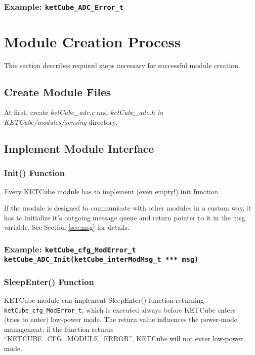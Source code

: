 \documentclass[twoside,a4paper]{refart}
\begin{document}
\subsubsection*{Example: {\tt ketCube\_ADC\_Error\_t}}

\clearpage
\section{Module Creation Process}
This section describes required steps necessary for successful module creation.

\subsection*{Create Module Files}
At first, create {\it ketCube\_adc.c} and {\it ketCube\_adc.h in} \\{\it KETCube/modules/sensing} directory.


\subsection*{Implement Module Interface}
\subsubsection*{Init() Function}
Every KETCube module has to implement (even empty!) init function.

If the module is designed to communicate with other modules in a custom way, it has to initialize it's outgoing message queue and return pointer to it in the msg variable. See Section \ref{sec:msg} for details.

\subsubsection*{Example: {\tt ketCube\_cfg\_ModError\_t ketCube\_ADC\_Init(ketCube\_interModMsg\_t *** msg)}}

\subsubsection*{SleepEnter() Function}
KETCube module can implement SleepEnter() function returning\\{\tt ketCube\_cfg\_ModError\_t}, which is executed always before KETCube enters (tries to enter) low-power mode. The return value influences the power-mode management: if the function returns\\“KETCUBE\_CFG\_MODULE\_ERROR”, KETCube will not enter low-power mode.
\end{document}
